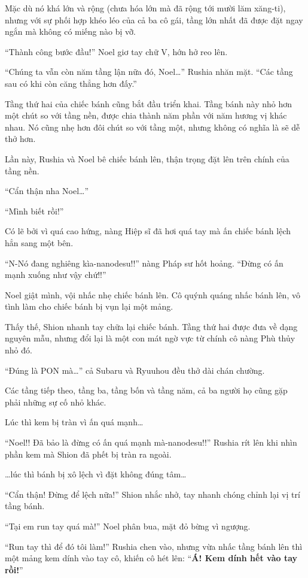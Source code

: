 \documentclass[../main.tex]{subfiles}
\begin{document}
Mặc dù nó khá lớn và rộng (chưa hóa lớn mà đã rộng tới mười lăm xăng-ti), nhưng với sự phối hợp khéo léo của cả ba cô gái, tầng lớn nhất đã được đặt ngay ngắn mà không có miếng nào bị vỡ.

``Thành công bước đầu!'' Noel giơ tay chữ V, hớn hở reo lên.

``Chúng ta vẫn còn năm tầng lận nữa đó, Noel\dots'' Rushia nhăn mặt. ``Các tầng sau có khi còn căng thẳng hơn đấy.''

Tầng thứ hai của chiếc bánh cũng bắt đầu triển khai. Tầng bánh này nhỏ hơn một chút so với tầng nền, được chia thành năm phần với năm hương vị khác nhau. Nó cũng nhẹ hơn đôi chút so với tầng một, nhưng không có nghĩa là sẽ dễ thở hơn.

Lần này, Rushia và Noel bê chiếc bánh lên, thận trọng đặt lên trên chính của tầng nền.

``Cẩn thận nha Noel\dots''

``Mình biết rồi!''

Có lẽ bởi vì quá cao hứng, nàng Hiệp sĩ đã hơi quá tay mà ấn chiếc bánh lệch hẳn sang một bên.

``N-Nó đang nghiêng kìa-nanodesu!!'' nàng Pháp sư hốt hoảng. ``Đừng có ấn mạnh xuống như vậy chứ!!''

Noel giật mình, vội nhấc nhẹ chiếc bánh lên. Cô quýnh quáng nhấc bánh lên, vô tình làm cho chiếc bánh bị vụn lại một mảng.

Thấy thế, Shion nhanh tay chữa lại chiếc bánh. Tầng thứ hai được đưa về dạng nguyên mẫu, nhưng đổi lại là một con mát ngờ vực từ chính cô nàng Phù thủy nhỏ đó.

``Đúng là PON mà\dots'' cả Subaru và Ryuuhou đều thở dài chán chường.

Các tầng tiếp theo, tầng ba, tầng bốn và tầng năm, cả ba người họ cũng gặp phải những sự cố nhỏ khác.

Lúc thì kem bị tràn vì ấn quá mạnh\dots

``Noel!! Đã bảo là đừng có ấn quá mạnh mà-nanodesu!!'' Rushia rít lên khi nhìn phần kem mà Shion đã phết bị tràn ra ngoài.

\dots lúc thì bánh bị xô lệch vì đặt không đúng tâm\dots

``Cẩn thận! Đừng để lệch nữa!'' Shion nhắc nhở, tay nhanh chóng chỉnh lại vị trí tầng bánh.

``Tại em run tay quá mà!'' Noel phân bua, mặt đỏ bừng vì ngượng.

``Run tay thì để đó tôi làm!'' Rushia chen vào, nhưng vừa nhấc tầng bánh lên thì một mảng kem dính vào tay cô, khiến cô hét lên: ``\textbf{Á! Kem dính hết vào tay rồi!}''
\end{document}
